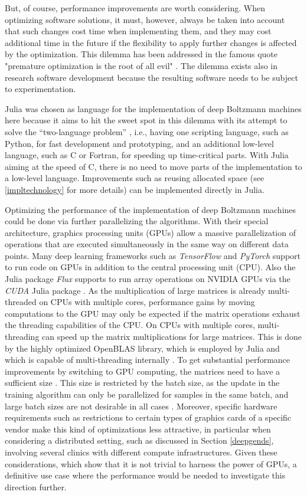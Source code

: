 \documentclass[12pt]{article}
\newcommand{\apkg}[1]{\emph{#1}}
\begin{document}
But, of course, performance improvements are worth considering.
When optimizing software solutions, it must, however, always be taken into account that such changes cost time when implementing them, and they may cost additional time in the future if the flexibility to apply further changes is affected by the optimization.
This dilemma has been addressed in the famous quote "premature optimization is the root of all evil" \citep{knuth_1974}.
The dilemma exists also in research software development because the resulting software needs to be subject to experimentation.

Julia was chosen as language for the implementation of deep Boltzmann machines here because it aims to hit the sweet spot in this dilemma with its attempt to solve the ``two-language problem'' \citep{bezanson2017julia}, i.e., having one scripting language, such as Python, for fast development and prototyping, and an additional low-level language, such as C or Fortran, for speeding up time-critical parts.
With Julia aiming at the speed of C, there is no need to move parts of the implementation to a low-level language.
Improvements such as reusing allocated space (see \ref{impltechnology} for more details) can be implemented directly in Julia.

Optimizing the performance of the implementation of deep Boltzmann machines could be done via further parallelizing the algorithms.
With their special architecture, graphics processing units (GPUs) allow a massive parallelization of operations that are executed simultaneously in the same way on different data points.
Many deep learning frameworks such as \apkg{TensorFlow} \citep{tensorflow} and \apkg{PyTorch} \citep{pytorch} support to run code on GPUs in addition to the central processing unit (CPU).
Also the Julia package \apkg{Flux} supports to run array operations on NVIDIA GPUs via the \apkg{CUDA} Julia package \citep{juliagpu}.
As the multiplication of large matrices is already multi-threaded on CPUs with multiple cores, performance gains by moving computations to the GPU may only be expected if the matrix operations exhaust the threading capabilities of the CPU.
On CPUs with multiple cores, multi-threading can speed up the matrix multiplications for large matrices.
This is done by the highly optimized OpenBLAS library, which is employed by Julia and which is capable of multi-threading internally \citep{openblas}.
To get substantial performance improvements by switching to GPU computing, the matrices need to have a sufficient size \citep{performancegpucpu}.
This size is restricted by the batch size, as the update in the training algorithm can only be parallelized for samples in the same batch, and large batch sizes are not desirable in all cases \citep{masters_revisiting_2018}.
Moreover, specific hardware requirements such as restrictions to certain types of graphics cards of a specific vendor make this kind of optimizations less attractive, in particular when considering a distributed setting, such as discussed in Section \ref{deepgends}, involving several clinics with different compute infrastructures.
Given these considerations, which show that it is not trivial to harness the power of GPUs, a definitive use case where the performance would be needed to investigate this direction further.
\end{document}
